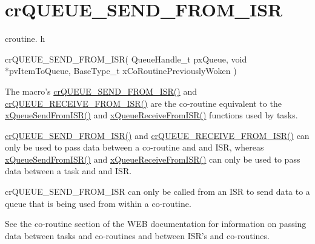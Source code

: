 \hypertarget{group__crQUEUE__SEND__FROM__ISR}{\section{cr\-Q\-U\-E\-U\-E\-\_\-\-S\-E\-N\-D\-\_\-\-F\-R\-O\-M\-\_\-\-I\-S\-R}
\label{group__crQUEUE__SEND__FROM__ISR}
}
croutine. h 
\begin{DoxyPre}
  crQUEUE\_SEND\_FROM\_ISR(
                            QueueHandle\_t pxQueue,
                            void *pvItemToQueue,
                            BaseType\_t xCoRoutinePreviouslyWoken
                       )\end{DoxyPre}


The macro's \hyperlink{croutine_8h_ac8eb0a81c5cf69de7e4edd73ce44a3be}{cr\-Q\-U\-E\-U\-E\-\_\-\-S\-E\-N\-D\-\_\-\-F\-R\-O\-M\-\_\-\-I\-S\-R()} and \hyperlink{croutine_8h_a9c0fa977ca69adbddb4811affa2a71f7}{cr\-Q\-U\-E\-U\-E\-\_\-\-R\-E\-C\-E\-I\-V\-E\-\_\-\-F\-R\-O\-M\-\_\-\-I\-S\-R()} are the co-\/routine equivalent to the \hyperlink{queue_8h_a21d5919ed26c21d121df4a4debeb643c}{x\-Queue\-Send\-From\-I\-S\-R()} and \hyperlink{queue_8h_acdf528f5c91131ae2f31c669cfd65758}{x\-Queue\-Receive\-From\-I\-S\-R()} functions used by tasks.

\hyperlink{croutine_8h_ac8eb0a81c5cf69de7e4edd73ce44a3be}{cr\-Q\-U\-E\-U\-E\-\_\-\-S\-E\-N\-D\-\_\-\-F\-R\-O\-M\-\_\-\-I\-S\-R()} and \hyperlink{croutine_8h_a9c0fa977ca69adbddb4811affa2a71f7}{cr\-Q\-U\-E\-U\-E\-\_\-\-R\-E\-C\-E\-I\-V\-E\-\_\-\-F\-R\-O\-M\-\_\-\-I\-S\-R()} can only be used to pass data between a co-\/routine and and I\-S\-R, whereas \hyperlink{queue_8h_a21d5919ed26c21d121df4a4debeb643c}{x\-Queue\-Send\-From\-I\-S\-R()} and \hyperlink{queue_8h_acdf528f5c91131ae2f31c669cfd65758}{x\-Queue\-Receive\-From\-I\-S\-R()} can only be used to pass data between a task and and I\-S\-R.

cr\-Q\-U\-E\-U\-E\-\_\-\-S\-E\-N\-D\-\_\-\-F\-R\-O\-M\-\_\-\-I\-S\-R can only be called from an I\-S\-R to send data to a queue that is being used from within a co-\/routine.

See the co-\/routine section of the W\-E\-B documentation for information on passing data between tasks and co-\/routines and between I\-S\-R's and co-\/routines.


